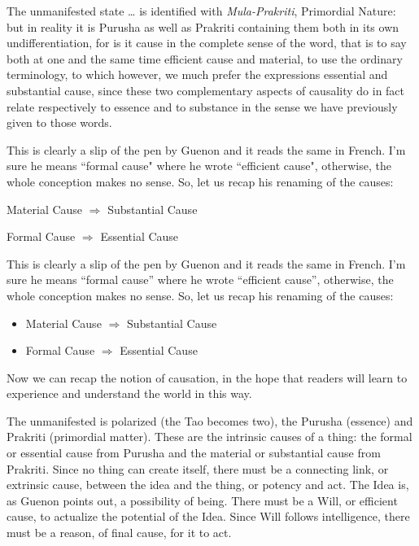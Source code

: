 \begin{quotex}
The unmanifested state … is identified with \emph{Mula-Prakriti}, Primordial Nature: but in reality it is Purusha as well as Prakriti containing them both in its own undifferentiation, for is it cause in the complete sense of the word, that is to say both at one and the same time efficient cause and material, to use the ordinary terminology, to which however, we much prefer the expressions essential and substantial cause, since these two complementary aspects of causality do in fact relate respectively to essence and to substance in the sense we have previously given to those words. 

\end{quotex}

This is clearly a slip of the pen by Guenon and it reads the same in French. I'm sure he means ``formal cause" where he wrote ``efficient cause", otherwise, the whole conception makes no sense. So, let us recap his renaming of the causes:

Material Cause $\Rightarrow $ Substantial Cause

Formal Cause $\Rightarrow $ Essential Cause

This is clearly a slip of the pen by Guenon and it reads the same in French. I'm sure he means “formal cause” where he wrote “efficient cause”, otherwise, the whole conception makes no sense. So, let us recap his renaming of the causes:

\begin{itemize}
\item Material Cause $\Rightarrow $ Substantial Cause
\item Formal Cause $\Rightarrow $ Essential Cause
\end{itemize}

Now we can recap the notion of causation, in the hope that readers will learn to experience and understand the world in this way.

The unmanifested is polarized (the Tao becomes two), the Purusha (essence) and Prakriti (primordial matter). These are the intrinsic causes of a thing: the formal or essential cause from Purusha and the material or substantial cause from Prakriti. Since no thing can create itself, there must be a connecting link, or extrinsic cause, between the idea and the thing, or potency and act. The Idea is, as Guenon points out, a possibility of being. There must be a Will, or efficient cause, to actualize the potential of the Idea. Since Will follows intelligence, there must be a reason, of final cause, for it to act.


